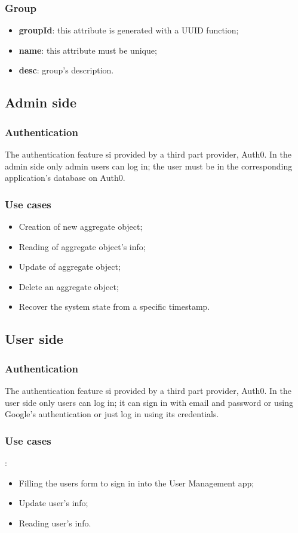 \subsubsection{Group}
\begin{itemize}
	\item \textbf{groupId}: this attribute is generated with a UUID function;
	\item \textbf{name}: this attribute must be unique;
	\item \textbf{desc}: group's description.
\end{itemize}

\subsection{Admin side}
\subsubsection{Authentication}
The authentication feature si provided by a third part provider, Auth0. In the admin side only admin users can log in; the user must be in the corresponding application's database on Auth0.
\subsubsection{Use cases}
\begin{itemize}
	\item Creation of new aggregate object;
	\item Reading of aggregate object's info;
	\item Update of aggregate object;
	\item Delete an aggregate object;
	\item Recover the system state from a specific timestamp.
\end{itemize}
	

\subsection{User side}
\subsubsection{Authentication}
The authentication feature si provided by a third part provider, Auth0. In the user side only users can log in; it can sign in with email and password or using Google's authentication or just log in using its credentials.
\subsubsection{Use cases}:
\begin{itemize}
	\item Filling the users form to sign in into the User Management app;
	\item Update user's info;
	\item Reading user's info.
\end{itemize}

